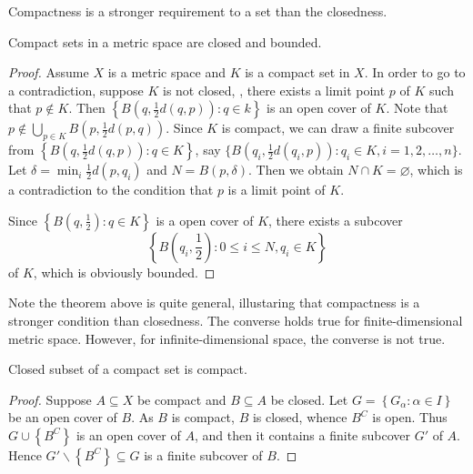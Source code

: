 Compactness is a stronger requirement to a set than the closedness.

\begin{thm}
Compact sets in a metric space are closed and bounded.
\end{thm}
\begin{proof}
Assume $X$ is a metric space and $K$ is a compact set in $X$. In order 
to go to a contradiction, suppose $K$ is not closed, \ie, there exists 
a limit point $p$ of $K$ such that $p \notin K$. 
Then $\left\{B(q, \frac{1}{2} d(q, p)) : q \in k\right\}$ is an open cover 
of $K$. 
Note that $p \notin \bigcup_{p \in K} B\left(p, \frac{1}{2}d(p, q)\right)$. 
Since $K$ is compact, we can draw a finite subcover from 
$\left\{B(q, \frac{1}{2} d(q, p)) : q \in K\right\}$, say 
$\{B(q_i, \frac{1}{2} d(q_i, p)) : q_i \in K, i = 1, 2, \ldots , n\}$. 
Let $\delta = \min_{i} \frac{1}{2}d(p, q_i)$ and $N = B(p, \delta)$. 
Then we obtain $N \cap K = \varnothing$, which is a contradiction to the 
condition that $p$ is a limit point of $K$. 

Since $\left\{ B(q, \frac{1}{2}): q \in K \right\}$ is a open cover of $K$, 
there exists a subcover 
\begin{equation*}
    \left\{ B(q_i, \frac{1}{2}): 0 \le i \le N, q_i \in K\right\} 
\end{equation*}
of $K$, which is obviously bounded. 
\end{proof}

\begin{rmk}
Note the theorem above is quite general, illustaring that compactness is a 
stronger condition than closedness. 
The converse holds true for finite-dimensional metric space. 
However, for infinite-dimensional space, the converse is not true.     
\end{rmk}

\begin{thm}
Closed subset of a compact set is compact.
\end{thm}
\begin{proof}
Suppose $A \subseteq X$ be compact and $B \subseteq A$ be closed. 
Let $G = \left\{ G_\alpha: \alpha \in I\right\}$ be an open cover of $B$. 
As $B$ is compact, $B$ is closed, whence $B^C$ is open. 
Thus $G \cup \left\{ B^C \right\}$ is an open cover of $A$, and then it 
contains a finite subcover $G'$ of $A$. 
Hence $G' \backslash \left\{ B^C\right\} \subseteq G$ is a finite subcover of 
$B$. 
\end{proof}

